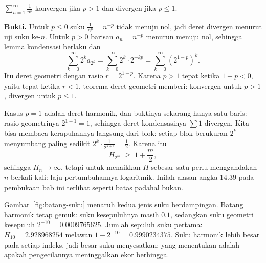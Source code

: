 \begin{teorema}[Deret-$p$]
$\sum_{n=1}^{\infty} \frac{1}{n^p}$ konvergen jika $p > 1$ dan divergen jika
$p \le 1$.
\end{teorema}

\noindent\textbf{Bukti.} Untuk $p \le 0$ suku $\frac{1}{n^p} = n^{-p}$ tidak menuju nol, jadi deret divergen
menurut uji suku ke-$n$. Untuk $p>0$ barisan $a_n = n^{-p}$ menurun menuju nol,
sehingga lemma kondensasi berlaku dan
\[
  \sum_{k=0}^{\infty} 2^k a_{2^k}
  = \sum_{k=0}^{\infty} 2^k \cdot 2^{-kp}
  = \sum_{k=0}^{\infty} \left(2^{1-p}\right)^{k}.
\]
Itu deret geometri dengan rasio $r = 2^{1-p}$. Karena $p>1$ tepat ketika $1-p<0$,
yaitu tepat ketika $r<1$, teorema deret geometri memberi: konvergen untuk $p>1$,
divergen untuk $p \le 1$.

Kasus $p=1$ adalah deret harmonik, dan buktinya sekarang hanya
satu baris: rasio
geometrinya $2^{1-1} = 1$, sehingga deret kondensasinya $\sum 1$ divergen. Kita bisa
membaca kerapuhannya langsung dari blok: setiap blok berukuran $2^k$ menyumbang paling
sedikit $2^k \cdot \frac{1}{2^{k+1}} = \tfrac{1}{2}$. Karena itu
\[
  H_{2^m} \;\ge\; 1 + \frac{m}{2},
\]
sehingga $H_n \to \infty$, tetapi untuk menaikkan $H$ sebesar satu perlu menggandakan
$n$ berkali-kali: laju pertumbuhannya logaritmik. Inilah alasan angka $14.39$ pada
pembukaan bab ini terlihat seperti batas padahal bukan.

Gambar~\ref{fig:batang-suku} menaruh kedua jenis suku berdampingan. Batang harmonik
tetap gemuk: suku kesepuluhnya masih $0.1$, sedangkan suku geometri kesepuluh
$2^{-10} = 0.0009765625$. Jumlah sepuluh suku pertama: $H_{10} = 2.928968254$ melawan
$1 - 2^{-10} = 0.9990234375$. Suku harmonik lebih besar pada setiap indeks, jadi besar
suku menyesatkan; yang menentukan adalah apakah pengecilannya meninggalkan ekor
berhingga.

